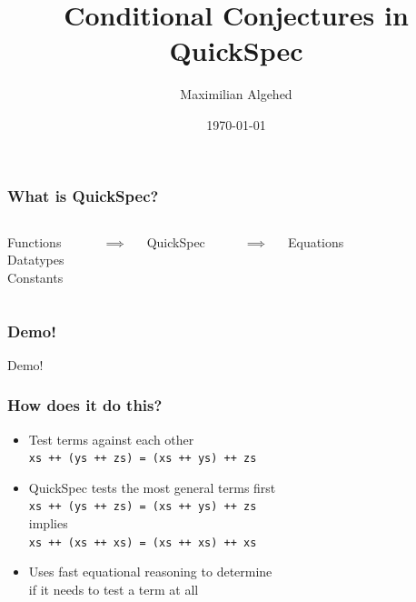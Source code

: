 \documentclass{beamer}
\title[Conditional Conjectures in QuickSpec]{Conditional Conjectures in QuickSpec} %
\author{Maximilian Algehed} %
\institute[CTH] %
{
Chalmers University of Technology \\ %
\medskip
\textit{m.algehed@gmail.com} %
}
\date{\today} %
\begin{document}
\begin{frame}
    \titlepage %
\end{frame}

\begin{frame}
    \frametitle{What is QuickSpec?}
    \begin{columns}
        \begin{block}{}
            Functions\\
            Datatypes\\
            Constants\\
        \end{block}

        \\
        \centerline{\Large{$\implies$}}

        \begin{block}{}
            QuickSpec
        \end{block}
        
        \\
        \centerline{\Large{$\implies$}}

        \begin{block}{}
            Equations
        \end{block}
    \end{columns}
\end{frame}

\begin{frame}
    \frametitle{Demo!}
        \Huge{\centerline{Demo!}}
\end{frame}

\begin{frame}
    \frametitle{How does it do this?}
        \begin{itemize}
            \item Test terms against each other\\\texttt{xs ++ (ys ++ zs) = (xs ++ ys) ++ zs}
            \item QuickSpec tests the most general terms first\\
                \texttt{xs ++ (ys ++ zs) = (xs ++ ys) ++ zs}\\implies\\\texttt{xs ++ (xs ++ xs) = (xs ++ xs) ++ xs}
            \item Uses fast equational reasoning to determine\\if it needs to test a term at all
        \end{itemize}
\end{frame}
\end{document}
